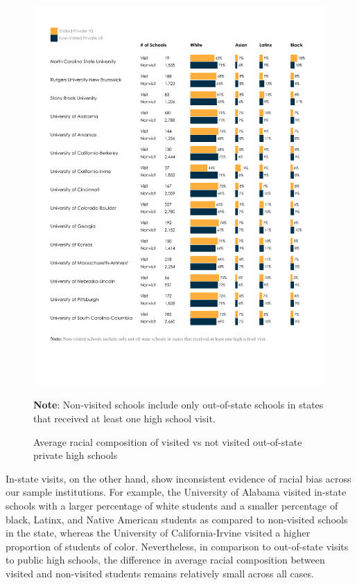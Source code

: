 \documentclass{article}
\begin{document}
\begin{figure}[!ht]
    \centering
    \includegraphics[width=\textwidth, trim={1.25cm, 4cm, 1cm, 1.5cm}, clip]{assets/graphs/race_graph_priv_out.pdf}
    \begin{flushleft}\textbf{Note}: Non-visited schools include only out-of-state schools in states that received at least one high school visit.\end{flushleft}
    \caption{Average racial composition of visited vs not visited out-of-state private high schools}
    \label{fig:race_graph_priv_out}
\end{figure}

In-state visits, on the other hand, show inconsistent evidence of racial bias across our sample institutions. For example, the University of Alabama visited in-state schools with a larger percentage of white students and a smaller percentage of black, Latinx, and Native American students as compared to non-visited schools in the state, whereas the University of California-Irvine visited a higher proportion of students of color. Nevertheless, in comparison to out-of-state visits to public high schools, the difference in average racial composition between visited and non-visited students remains relatively small across all cases.
\end{document}
